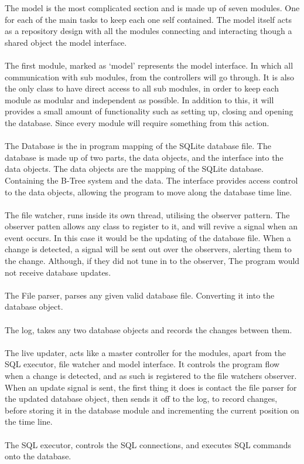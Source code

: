 The model is the most complicated section and is made up of seven modules. One for each of the main tasks to keep each one self contained. The model itself acts as a repository design with all the modules connecting and interacting though a shared object the model interface.
\\\\
The first module, marked as `model' represents the model interface. In which all communication with sub modules, from the controllers will go through. It is also the only class to have direct access to all sub modules, in order to keep each module as modular and independent as possible. In addition to this, it will provides a small amount of functionality such as setting up, closing and opening the database. Since every module will require something from this action.
\\\\
The Database is the in program mapping of the SQLite database file. The database is made up of two parts, the data objects, and the interface into the data objects. The data objects are the mapping of the SQLite database. Containing the B-Tree system and the data. The interface provides access control to the data objects, allowing the program to move along the database time line.
\\\\
The file watcher, runs inside its own thread, utilising the observer pattern. The observer patten allows any class to register to it, and will revive a signal when an event occurs. In this case it would be the updating of the database file. When a change is detected, a signal will be sent out over the observers, alerting them to the change. Although, if they did not tune in to the observer, The program would not receive database updates.
\\\\
The File parser, parses any given valid database file. Converting it into the database object.
\\\\
The log, takes any two database objects and records the changes between them.
\\\\
The live updater, acts like a master controller for the modules, apart from the SQL executor, file watcher and model interface. It controls the program flow when a change is detected, and as such is registered to the file watchers observer. When an update signal is sent, the first thing it does is contact the file parser for the updated database object, then sends it off to the log, to record changes, before storing it in the database module and incrementing the current position on the time line.
\\\\
The SQL executor, controls the SQL connections, and executes SQL commands onto the database.

